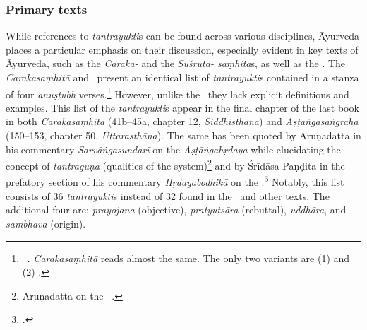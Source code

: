 \subsubsection{Primary texts}
While references to \emph{tantrayukti}s can be found across various disciplines, 
Āyurveda places a particular emphasis on their discussion, 
especially evident in key texts of Āyurveda, 
such as the \emph{Caraka-} and the \emph{Suśruta- saṃhitā}s, 
as well as the \AS. The \emph{Carakasaṃhitā} and \AS\ present an identical list of \emph{tantrayukti}s contained in a stanza of four \emph{anuṣṭubh} verses.\footnote{\label{CaAsT}
	\begin{verse}
	\end{verse}
	\AS\ . \emph{Carakasaṃhitā}  reads almost the same. The only two variants are (1)  and (2) .
	} 
However, unlike the \SS\ they lack explicit definitions and examples. 
This list of the \emph{tantrayukti}s appear in the final chapter of the last book 
in both \emph{Carakasaṃhitā} (41b--45a, chapter 12, \emph{Siddhisthāna}) and 
\emph{Aṣṭāṅgasaṅgraha} (150--153, chapter 50, \emph{Uttarasthāna}). 
The same has been quoted by Aruṇadatta in his commentary \emph{Sarvāṅgasundarī} on the \emph{Aṣṭāṅgahṛdaya} 
while elucidating the concept of \emph{tantraguṇa} (qualities of the system)\footnote{Aruṇadatta on the \AHS\ .}  
and by Śrīdāsa Paṇḍita in the prefatory section of his commentary \emph{Hṛdayabodhikā} on the \AHS.\footcite[1--2]{muss-1940}
Notably, this list consists of 36 \emph{tantrayukti}s instead of 32 found in the \SS\ and other texts. The additional four are: \emph{prayojana} (objective), \emph{pratyutsāra} (rebuttal), \emph{uddhāra}, and \emph{sambhava} (origin). 

